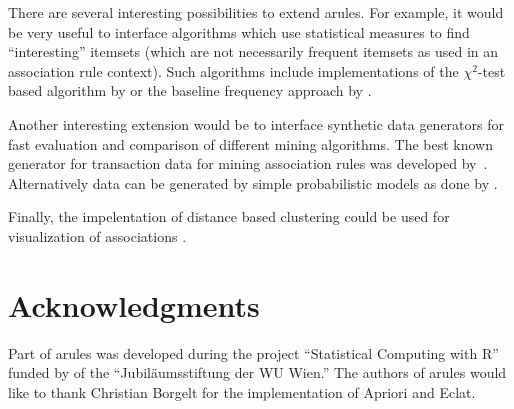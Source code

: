 \documentclass[10pt,a4paper]{article}
\newcommand{\strong}[1]{{\normalfont\fontseries{b}\selectfont #1}}
\newcommand{\pkg}[1]{\strong{#1}}
\begin{document}
There are several interesting possibilities to extend \pkg{arules}.  For
example, it would be very useful to interface algorithms which use
statistical measures to find ``interesting'' itemsets (which are not
necessarily frequent itemsets as used in an association rule context).
Such algorithms include implementations of the $\chi^2$-test based
algorithm by \cite{arules:Silverstein+Brin+Motwani:1998} or the baseline
frequency approach by \cite{arules:DuMouchel+Pregibon2001}.

Another interesting extension would be to interface synthetic data 
generators for fast evaluation and comparison of different mining algorithms.
The best known generator for
transaction data for mining association rules
was developed by~\cite{arules:Agrawal+Srikant:1994}.
Alternatively data can be generated by simple probabilistic models 
as done by
\cite{arules:Hahsler+Hornik+Reutterer:2005}.

Finally, the impelentation of distance based
clustering could be used for visualization of associations 
\citep[see e.g.,][]{arules:Strehl+Gosh:2003}.

\section*{Acknowledgments}
Part of \pkg{arules} was developed  during the project 
``Statistical Computing with R'' funded by  of the
``Jubil\"aumsstiftung der WU Wien.''
The authors of \pkg{arules} would like to thank Christian Borgelt for the
implementation of Apriori and Eclat.




\end{document}
